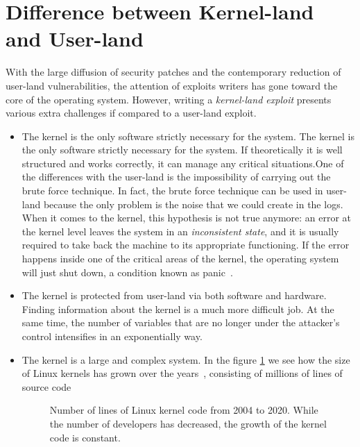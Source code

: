 \documentclass{masterthesis}
\begin{document}
\section{Difference between Kernel-land and User-land}
\label{sect:land}
With the large diffusion of security patches and the contemporary reduction of user-land vulnerabilities, the attention of exploits writers has gone toward the core of the operating system.
However, writing a \emph{kernel-land exploit} presents various extra challenges if compared to a user-land exploit.
\begin{itemize}
\item The kernel is the only software strictly necessary for the system. The kernel is the only software strictly necessary for the system. If theoretically it is well structured and works correctly, it can manage any critical situations.One of the differences with the user-land is the impossibility of carrying out the brute force technique. In fact, the brute force technique can be used in user-land because the only problem is the noise that we could create in the logs.
When it comes to the kernel, this hypothesis is not true anymore: an error at the kernel level leaves the system in an \emph{inconsistent state}, and it is usually required to take back the machine to its appropriate functioning.
If the error happens inside one of the critical areas of the kernel, the operating system will just shut down, a condition known as panic~\cite{cheng2021kernel}.
\item The kernel is protected from user-land via both software and hardware. Finding information about the kernel is a much more difficult job. At the same time, the number of variables that are no longer under the attacker’s control intensifies in an exponentially way. 
\item The kernel is a large and complex system. In the figure \ref{figure:line_code_graphview} we see how the size of Linux kernels has grown over the years~\cite{codeLinux}, consisting of millions of lines of source code
\begin{figure}[h!]
  \caption{Number of lines of Linux kernel code from 2004 to 2020. While the number of developers has decreased, the growth of the kernel code is constant.}\label{figure:line_code_graphview}
\end{figure} 
\end{itemize}
\end{document}
